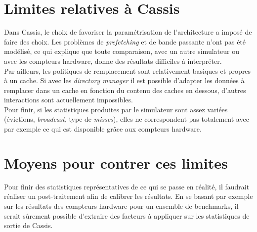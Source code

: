 \section{Limites relatives à \textsf{Cassis}}
Dans \textsf{Cassis}, le choix de favoriser la paramétrisation de l'architecture a imposé de faire des choix. Les problèmes de \emph{prefetching} et de bande passante n'ont pas été modélisé, ce qui explique que toute comparaison, avec un autre simulateur ou avec les compteurs hardware, donne des résultats difficiles à interpréter. \\

Par ailleurs, les politiques de remplacement sont relativement basiques et propres à un cache. Si avec les \emph{directory manager} il est possible d'adapter les données à remplacer dans un cache en fonction du contenu des caches en dessous, d'autres interactions sont actuellement impossibles. \\

Pour finir, si les statistiques produites par le simulateur sont assez variées (évictions, \emph{broadcast}, type de \emph{misses}), elles ne correspondent pas totalement avec par exemple ce qui est disponible grâce aux compteurs hardware.

\section{Moyens pour contrer ces limites}
Pour finir des statistiques représentatives de ce qui se passe en réalité, il faudrait réaliser un post-traitement afin de calibrer les résultats. En se basant par exemple sur les résultats des compteurs hardware pour un ensemble de benchmarks, il serait sûrement possible d'extraire des facteurs à appliquer sur les statistiques de sortie de \textsf{Cassis}.
